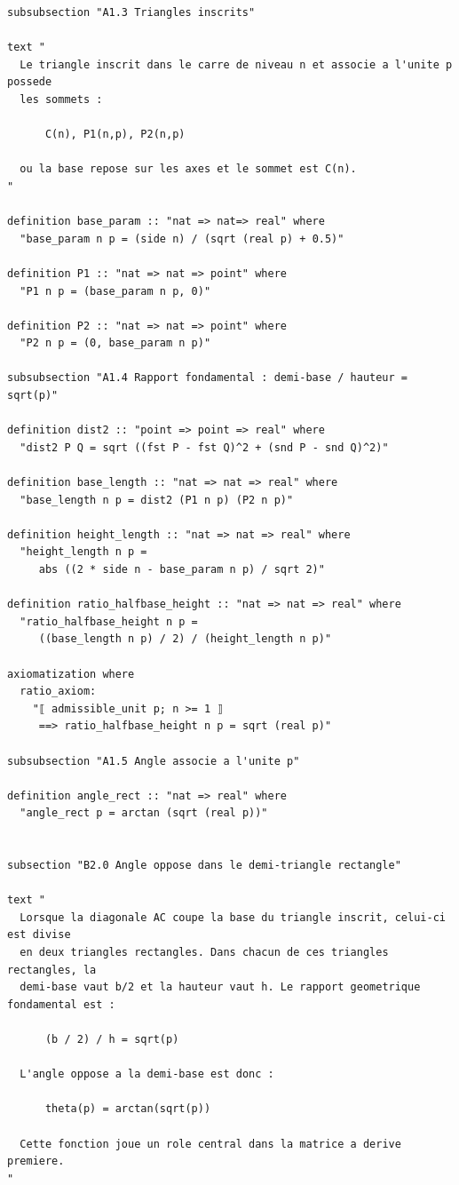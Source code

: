 \documentclass[12pt,a4paper]{article}
\theoremstyle{definition}
\theoremstyle{remark}
\begin{document}
\begin{verbatim}
subsubsection "A1.3 Triangles inscrits"

text "
  Le triangle inscrit dans le carre de niveau n et associe a l'unite p possede
  les sommets :

      C(n), P1(n,p), P2(n,p)

  ou la base repose sur les axes et le sommet est C(n).
"

definition base_param :: "nat => nat=> real" where
  "base_param n p = (side n) / (sqrt (real p) + 0.5)"

definition P1 :: "nat => nat => point" where
  "P1 n p = (base_param n p, 0)"

definition P2 :: "nat => nat => point" where
  "P2 n p = (0, base_param n p)"

subsubsection "A1.4 Rapport fondamental : demi-base / hauteur = sqrt(p)"

definition dist2 :: "point => point => real" where
  "dist2 P Q = sqrt ((fst P - fst Q)^2 + (snd P - snd Q)^2)"

definition base_length :: "nat => nat => real" where
  "base_length n p = dist2 (P1 n p) (P2 n p)"

definition height_length :: "nat => nat => real" where
  "height_length n p =
     abs ((2 * side n - base_param n p) / sqrt 2)"

definition ratio_halfbase_height :: "nat => nat => real" where
  "ratio_halfbase_height n p =
     ((base_length n p) / 2) / (height_length n p)"

axiomatization where
  ratio_axiom:
    "⟦ admissible_unit p; n >= 1 ⟧
     ==> ratio_halfbase_height n p = sqrt (real p)"

subsubsection "A1.5 Angle associe a l'unite p"

definition angle_rect :: "nat => real" where
  "angle_rect p = arctan (sqrt (real p))"


subsection "B2.0 Angle oppose dans le demi-triangle rectangle"

text "
  Lorsque la diagonale AC coupe la base du triangle inscrit, celui-ci est divise
  en deux triangles rectangles. Dans chacun de ces triangles rectangles, la
  demi-base vaut b/2 et la hauteur vaut h. Le rapport geometrique fondamental est :

      (b / 2) / h = sqrt(p)

  L'angle oppose a la demi-base est donc :

      theta(p) = arctan(sqrt(p))

  Cette fonction joue un role central dans la matrice a derive premiere.
"



\end{verbatim}
\end{document}
